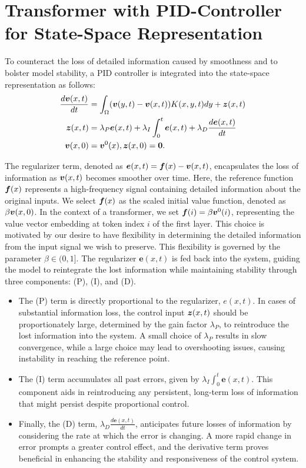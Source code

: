 \section{Transformer with PID-Controller for State-Space Representation}
\label{sec:pid-control}
To counteract the loss of detailed information caused by smoothness and to bolster model stability, a PID controller is integrated into the state-space representation as follows:
\begin{align}
\label{eq:state-space-pid}
    \displaystyle \frac{d{\bm v}(x, t)}{dt} &=\displaystyle \int_{\Omega}({\bm v}(y, t) - {\bm v}(x, t))K(x, y, t)dy + \bm{z}(x, t) \nonumber \\
    \bm{z}(x, t) &=\displaystyle \lambda_P\bm{e}(x, t) + \lambda_I\int_0^{t}\bm{e}(x, t) + \lambda_D\frac{d\bm{e}(x, t)}{dt} \nonumber \\
    {\bm v}(x, 0) &= {\bm v}^0(x), {\bm z}(x, 0) = \bm{0}.
\end{align}

The regularizer term, denoted as $\bm{e}(x, t) = {\bm f}(x) - {\bm v}(x, t)$, encapsulates the loss of information as ${\bm v}(x, t)$ becomes smoother over time. Here, the reference function ${\bm f}(x)$ represents a high-frequency signal containing detailed information about the original inputs. We select ${\bm f}(x)$ as the scaled initial value function, denoted as $\beta{\bm v}(x, 0)$. In the context of a transformer, we set ${\bm f}(i) = \beta{\bm v}^0(i)$, representing the value vector embedding at token index $i$ of the first layer. This choice is motivated by our desire to have flexibility in determining the detailed information from the input signal we wish to preserve. This flexibility is governed by the parameter $\beta \in (0, 1]$. The regularizer $\bm{e}(x, t)$ is fed back into the system, guiding the model to reintegrate the lost information while maintaining stability through three components: (P), (I), and (D).

\vspace{-3mm}
\begin{itemize}
    \item The (P) term is directly proportional to the regularizer, $e(x, t)$. In cases of substantial information loss, the control input ${\bm z}(x, t)$ should be proportionately large, determined by the gain factor $\lambda_P$, to reintroduce the lost information into the system. A small choice of $\lambda_P$ results in slow convergence, while a large choice may lead to overshooting issues, causing instability in reaching the reference point.
    \item The (I) term accumulates all past errors, given by $\lambda_I\int_0^{t}\bm{e}(x, t)$. This component aids in reintroducing any persistent, long-term loss of information that might persist despite proportional control.
    \item Finally, the (D) term, $\displaystyle \lambda_D\frac{d\bm{e}(x, t)}{dt}$, anticipates future losses of information by considering the rate at which the error is changing. A more rapid change in error prompts a greater control effect, and the derivative term proves beneficial in enhancing the stability and responsiveness of the control system.
\end{itemize}

